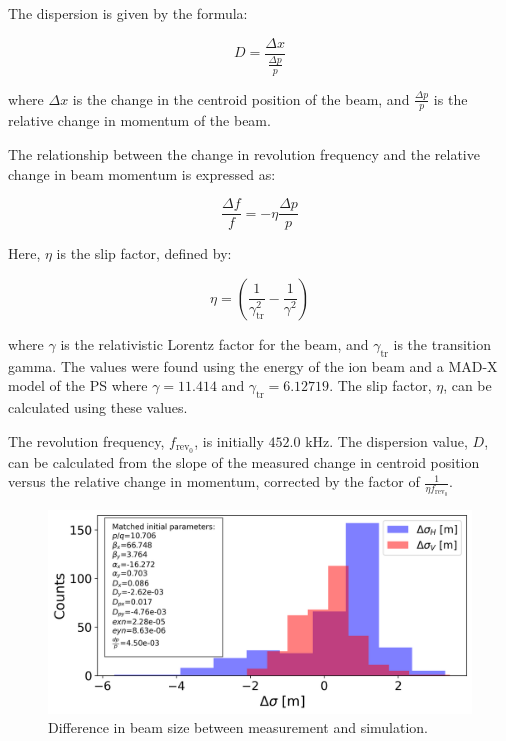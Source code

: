 \documentclass[a4paper,
               ]{jacow}
\begin{document}
The dispersion is given by the formula:

\begin{equation}
D = \frac{\Delta x}{\frac{\Delta p}{p}}
\end{equation}

where $\Delta x$ is the change in the centroid position of the beam, and $\frac{\Delta p}{p}$ is the relative change in momentum of the beam.

The relationship between the change in revolution frequency and the relative change in beam momentum is expressed as:

\begin{equation}
\frac{\Delta f}{f} = -\eta \frac{\Delta p}{p}
\end{equation}

Here, $\eta$ is the slip factor, defined by:

\begin{equation}
\eta = \left(\frac{1}{\gamma_{\text{tr}}^{2}} - \frac{1}{\gamma^{2}}\right)
\end{equation}

where $\gamma$ is the relativistic Lorentz factor for the beam, and $\gamma_{\text{tr}}$ is the transition gamma. The values were found using the energy of the ion beam and a MAD-X model of the PS where $\gamma = 11.414$ and $\gamma_{\text{tr}} = 6.12719$. The slip factor, $\eta$, can be calculated using these values.

The revolution frequency, $f_{\text{rev}_0}$, is initially $452.0$ kHz. The dispersion value, $D$, can be calculated from the slope of the measured change in centroid position versus the relative change in momentum, corrected by the factor of $\frac{1}{\eta f_{\text{rev}_0}}$.



\begin{figure}[!htb]
   \centering
   \includegraphics*[width=1.0\columnwidth]{beam_size_diff.png}
   \caption{Difference in beam size between measurement and simulation.}
   \label{fig:diff_beam_size}
\end{figure}
\end{document}
